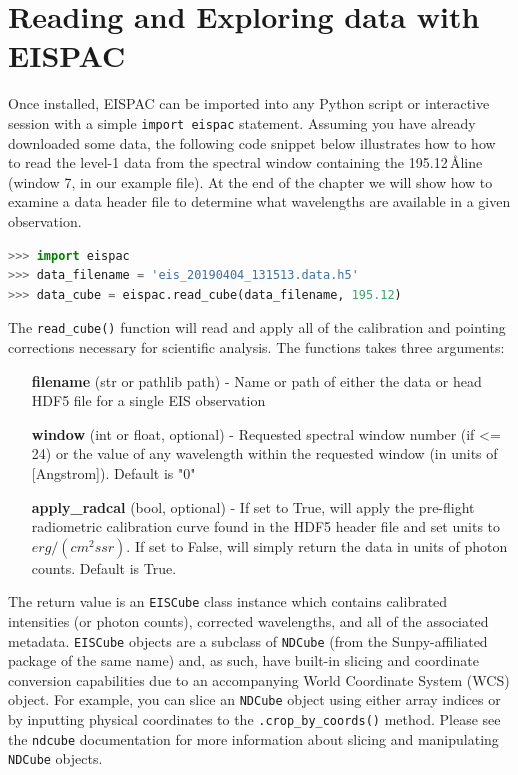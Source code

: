 \section{Reading and Exploring data with EISPAC}
Once installed, EISPAC can be imported into any Python script or interactive session with a simple \verb+import eispac+ statement. Assuming you have already downloaded some data, the following code snippet below illustrates how to how to read the level-1 data from the spectral window containing the
 195.12\,\AA line (window 7, in our example file). At the end of the chapter we will show how to examine a data header file to determine what wavelengths are available in a given observation.

\begin{lstlisting}[language=Python]
>>> import eispac
>>> data_filename = 'eis_20190404_131513.data.h5'
>>> data_cube = eispac.read_cube(data_filename, 195.12)
\end{lstlisting}

The \verb+read_cube()+ function will read and apply all of the calibration and pointing corrections
necessary for scientific analysis. The functions takes three arguments:
\begin{enumerate}
\item[\bf filename] (str or pathlib path) - Name or path of either the data or head HDF5 file for a
  single EIS observation
\item[\bf window] (int or float, optional) - Requested spectral window number (if <= 24) or the
  value of any wavelength within the requested window (in units of [Angstrom]). Default is "0"
\item[\bf apply\_radcal] (bool, optional) - If set to True, will apply the pre-flight radiometric
  calibration curve found in the HDF5 header file and set units to $erg/(cm^2 s sr)$. If set to False,
  will simply return the data in units of photon counts. Default is True.
\end{enumerate}

The return value is an \verb+EISCube+ class instance which contains calibrated intensities (or photon
counts), corrected wavelengths, and all of the associated metadata. \verb+EISCube+ objects are a
subclass of \verb+NDCube+ (from the Sunpy-affiliated package of the same name) and, as such, have
built-in slicing and coordinate conversion capabilities due to an accompanying World Coordinate
System (WCS) object. For example, you can slice an \verb+NDCube+ object using either array indices or
by inputting physical coordinates to the \verb+.crop_by_coords()+ method. Please see the
\verb+ndcube+ documentation for more information about slicing and manipulating \verb+NDCube+ objects.

